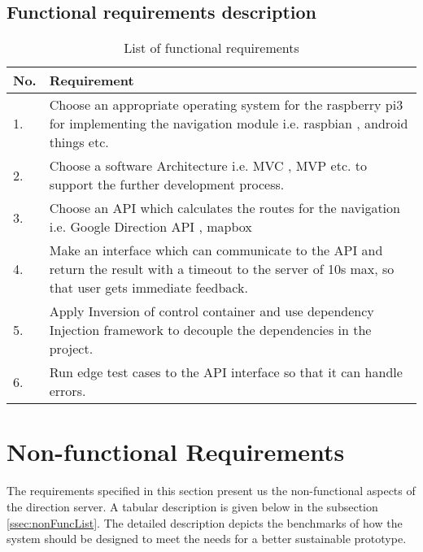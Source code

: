         \subsection{Functional requirements description}
            \label{ssec:FuncList}
            \begin{table}[h!]
                \centering
                    \begin{tabular}{|p{1cm}||p{15cm}|}
                        \hline
                            No. &  Requirement \\
                        \hline
                            1. & Choose an appropriate operating system for the raspberry pi3 for implementing 
                            the navigation module i.e. raspbian \cite{raspbien}, 
                            android things \cite{androidThings} etc.\\
                        \hline
                            2. & Choose a software Architecture i.e. MVC \cite{mvc}, MVP \cite{mvp}
                            etc. to support the further development process.\\ 
                        \hline
                            3. & Choose an API which calculates the routes for the navigation i.e. Google Direction API \cite{googleDirecAPI}, mapbox \cite{mapbox} \\     
                        \hline
                            4. & Make an interface which can communicate to the API and return the result with a 
                            timeout to the server of 10s max, so that user gets immediate feedback. \\    
                        \hline  
                            5. & Apply Inversion of control container and use dependency Injection 
                            \cite{Martinfowler2014} framework to decouple the  dependencies 
                            in the project.\\
                        \hline   
                            6. & Run edge test cases to the API interface so that it can handle
                            errors.\\    
                        \hline    
                    \end{tabular}
                    \caption{List of functional requirements}
                    \label{table:functionalRequirements}
            \end{table}  

    \section{Non-functional Requirements}
        The requirements specified in this section present us the non-functional aspects of the 
        direction server. A tabular description is given below in the subsection 
        \ref{ssec:nonFuncList}. The detailed description depicts the benchmarks of how the system
        should be designed to meet the needs for a better sustainable prototype.

